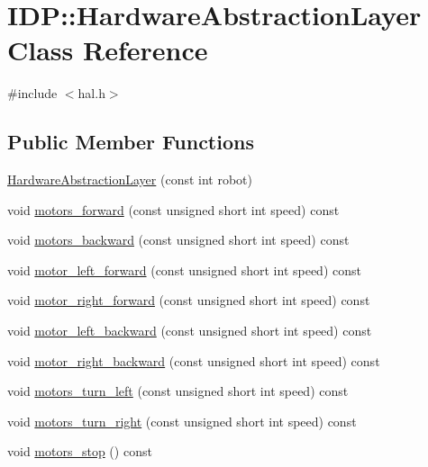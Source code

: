 \hypertarget{classIDP_1_1HardwareAbstractionLayer}{
\section{IDP::HardwareAbstractionLayer Class Reference}
\label{classIDP_1_1HardwareAbstractionLayer}
}


{\ttfamily \#include $<$hal.h$>$}

\subsection*{Public Member Functions}
\begin{DoxyCompactItemize}
\item 
\hyperlink{classIDP_1_1HardwareAbstractionLayer_a424d40bbaed459f571b46dbb45bb8576}{HardwareAbstractionLayer} (const int robot)
\item 
void \hyperlink{classIDP_1_1HardwareAbstractionLayer_a0c5a7c42e881c0b4bf8b3f5497c1e4ca}{motors\_\-forward} (const unsigned short int speed) const 
\item 
void \hyperlink{classIDP_1_1HardwareAbstractionLayer_a43a8ac2e89e101cd8976ce10401e6142}{motors\_\-backward} (const unsigned short int speed) const 
\item 
void \hyperlink{classIDP_1_1HardwareAbstractionLayer_a164279a4dd6b8cbbc32f6b2bc3f27577}{motor\_\-left\_\-forward} (const unsigned short int speed) const 
\item 
void \hyperlink{classIDP_1_1HardwareAbstractionLayer_a2b0e3948f124ba41ef711a83e79cd5a3}{motor\_\-right\_\-forward} (const unsigned short int speed) const 
\item 
void \hyperlink{classIDP_1_1HardwareAbstractionLayer_a2e804836935e0d66e813f68c09ca3cd1}{motor\_\-left\_\-backward} (const unsigned short int speed) const 
\item 
void \hyperlink{classIDP_1_1HardwareAbstractionLayer_ae7253b2277bc9252c1477e6b71bb0122}{motor\_\-right\_\-backward} (const unsigned short int speed) const 
\item 
void \hyperlink{classIDP_1_1HardwareAbstractionLayer_adeb07393ffab83877500183162c0bed2}{motors\_\-turn\_\-left} (const unsigned short int speed) const 
\item 
void \hyperlink{classIDP_1_1HardwareAbstractionLayer_abf4317f045b498e7e67aff208fa8d519}{motors\_\-turn\_\-right} (const unsigned short int speed) const 
\item 
void \hyperlink{classIDP_1_1HardwareAbstractionLayer_a186e188450a83ec4174670e1eb6c40bb}{motors\_\-stop} () const 

\end{DoxyCompactItemize}

